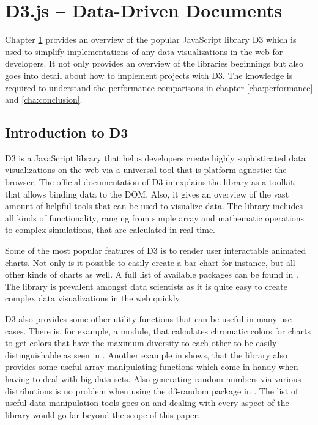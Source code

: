 \chapter{D3.js – Data-Driven Documents}
\label{cha:d3js}

Chapter \ref{cha:d3js} provides an overview of the popular JavaScript library D3 which is used to simplify implementations of any data visualizations in the web for developers. It not only provides an overview of the libraries beginnings but also goes into detail about how to implement projects with D3. The knowledge is required to understand the performance comparisons in chapter \ref{cha:performance} and \ref{cha:conclusion}.


\section{Introduction to D3}

D3 is a JavaScript library that helps developers create highly sophisticated data visualizations on the web via a universal tool that is platform agnostic: the browser. The official documentation of D3 in \cite{D3Website} explains the library as a toolkit, that allows binding data to the DOM. Also, it gives an overview of the vast amount of helpful tools that can be used to visualize data. The library includes all kinds of functionality, ranging from simple array and mathematic operations to complex simulations, that are calculated in real time.

Some of the most popular features of D3 is to render user interactable animated charts. Not only is it possible to easily create a bar chart for instance, but all other kinds of charts as well. A full list of available packages can be found in \cite{D3Github}. The library is prevalent amongst data scientists as it is quite easy to create complex data visualizations in the web quickly.

D3 also provides some other utility functions that can be useful in many use-cases. There is, for example, a module, that calculates chromatic colors for charts to get colors that have the maximum diversity to each other to be easily distinguishable as seen in \cite[/d3-scale-chromatic]{D3Github}. Another example in \cite[/d3-array]{D3Github} shows, that the library also provides some useful array manipulating functions which come in handy when having to deal with big data sets. Also generating random numbers via various distributions is no problem when using the d3-random package in \cite[/d3-random]{D3Github}. The list of useful data manipulation tools goes on and dealing with every aspect of the library would go far beyond the scope of this paper. 

